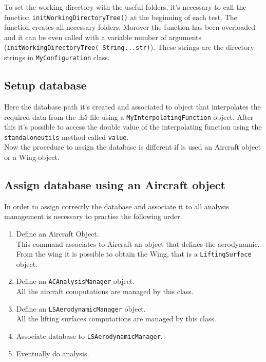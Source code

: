 To set the working directory with the useful folders, it's necessary to call the function \texttt{initWorkingDirectoryTree()} at the beginning of each test. The function creates all necessary folders. Morover the function has been overloaded and it can be even called with a variable number of arguments (\texttt{initWorkingDirectoryTree( String...str)}). These strings are the directory strings in \texttt{MyConfiguration} class.


\subsection {Setup database}
Here the database path it's created and associated to object that interpolates the required data from the .h5 file using a \texttt{MyInterpolatingFunction} object. After this it's possible to access the double value of the interpolating function using the \texttt{standaloneutils} method called \texttt{value}. \\


%

Now the procedure to assign the database is different if is used an Aircraft object or a Wing object.

\subsection {Assign database using an Aircraft object}
In order to assign correctly the database and associate it to all analysis management is necessary to practise the following order.
\begin{enumerate}
\item Define an Aircraft Object.\\This command associates to Aircraft an object that defines the aerodynamic. From the wing it is possible to obtain the Wing, that is a \texttt{LiftingSurface} object.
\item Define an \texttt{ACAnalysisManager} object.\\All the aircraft computations are managed by this class.
\item Define an \texttt{LSAerodynamicManager} object.\\ All the lifting surfaces computations are managed by this class.
\item Associate database to \texttt{LSAerodynamicManager}.
\item Eventually do analysis.
\end{enumerate}

